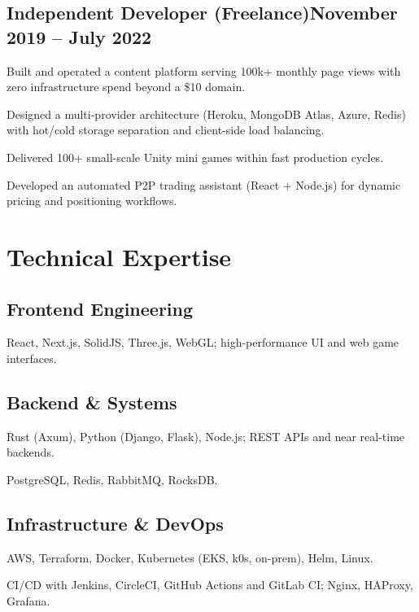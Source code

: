 \subsection{{Independent Developer (Freelance)\hfill November 2019 -- July 2022}}
\begin{zitemize}
\item Built and operated a content platform serving 100k+ monthly page views with zero infrastructure spend beyond a \$10 domain.
\item Designed a multi-provider architecture (Heroku, MongoDB Atlas, Azure, Redis) with hot/cold storage separation and client-side load balancing.
\item Delivered 100+ small-scale Unity mini games within fast production cycles.
\item Developed an automated P2P trading assistant (React + Node.js) for dynamic pricing and positioning workflows.
\end{zitemize}

\section{Technical Expertise}

\subsection{{Frontend Engineering}}
\begin{zitemize}
\item React, Next.js, SolidJS, Three.js, WebGL; high-performance UI and web game interfaces.
\end{zitemize}

\subsection{{Backend \& Systems}}
\begin{zitemize}
\item Rust (Axum), Python (Django, Flask), Node.js; REST APIs and near real-time backends.
\item PostgreSQL, Redis, RabbitMQ, RocksDB.
\end{zitemize}

\subsection{{Infrastructure \& DevOps}}
\begin{zitemize}
\item AWS, Terraform, Docker, Kubernetes (EKS, k0s, on-prem), Helm, Linux.
\item CI/CD with Jenkins, CircleCI, GitHub Actions and GitLab CI; Nginx, HAProxy, Grafana.
\end{zitemize}

